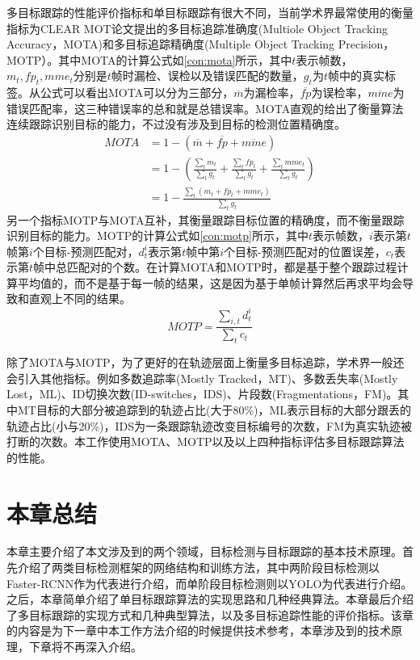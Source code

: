 多目标跟踪的性能评价指标和单目标跟踪有很大不同，当前学术界最常使用的衡量指标为CLEAR MOT\cite{bernardin2008evaluating}论文提出的多目标追踪准确度(Multiole Object Tracking Accuracy，MOTA)和多目标追踪精确度(Multiple Object Tracking Precision，MOTP）。其中MOTA的计算公式如\ref{con:mota}所示，其中$t$表示帧数，$m_t, fp_t, mme_t$分别是$t$帧时漏检、误检以及错误匹配的数量，$g_t$为$t$帧中的真实标签。从公式可以看出MOTA可以分为三部分，$\overline{m}$为漏检率，$\overline{fp}$为误检率，$\overline{mme}$为错误匹配率，这三种错误率的总和就是总错误率。MOTA直观的给出了衡量算法连续跟踪识别目标的能力，不过没有涉及到目标的检测位置精确度。
\begin{equation}
\begin{split}
MOTA & = 1 - (\overline{m} + \overline{fp} + \overline{mme})\\
& = 1 - \left(\frac{\sum_t m_t}{\sum_t g_t} + \frac{\sum_t fp_t}{\sum_t g_t} + \frac{\sum_t mme_t}{\sum_t g_t} \right)\\
& = 1 - \frac{\sum_t (m_t + fp_t + mme_t)}{\sum_t g_t}
\end{split}
\label{con:mota}
\end{equation}
另一个指标MOTP与MOTA互补，其衡量跟踪目标位置的精确度，而不衡量跟踪识别目标的能力。MOTP的计算公式如\ref{con:motp}所示，其中$t$表示帧数，$i$表示第$t$帧第$i$个目标-预测匹配对，$d^i_t$表示第$t$帧中第$i$个目标-预测匹配对的位置误差，$c_t$表示第$t$帧中总匹配对的个数。在计算MOTA和MOTP时，都是基于整个跟踪过程计算平均值的，而不是基于每一帧的结果，这是因为基于单帧计算然后再求平均会导致和直观上不同的结果。
\begin{equation}
MOTP = \frac{\sum_{i,t} d^i_t}{\sum_t c_t}
\label{con:motp}
\end{equation}

除了MOTA与MOTP，为了更好的在轨迹层面上衡量多目标追踪，学术界一般还会引入其他指标。例如多数追踪率(Mostly Tracked，MT)、多数丢失率(Mostly Lost，ML)、ID切换次数(ID-switches，IDS)、片段数(Fragmentations，FM)。其中MT目标的大部分被追踪到的轨迹占比(大于80\%)，ML表示目标的大部分跟丢的轨迹占比(小与20\%)，IDS为一条跟踪轨迹改变目标编号的次数，FM为真实轨迹被打断的次数。本工作使用MOTA、MOTP以及以上四种指标评估多目标跟踪算法的性能。

\section{本章总结}
\label{tech_conclusion}
本章主要介绍了本文涉及到的两个领域，目标检测与目标跟踪的基本技术原理。首先介绍了两类目标检测框架的网络结构和训练方法，其中两阶段目标检测以Faster-RCNN作为代表进行介绍，而单阶段目标检测则以YOLO为代表进行介绍。之后，本章简单介绍了单目标跟踪算法的实现思路和几种经典算法。本章最后介绍了多目标跟踪的实现方式和几种典型算法，以及多目标追踪性能的评价指标。该章的内容是为下一章中本工作方法介绍的时候提供技术参考，本章涉及到的技术原理，下章将不再深入介绍。

\ifprint
	\newpage
	\thispagestyle{empty}
	\mbox{}
	
	\clearpage
	\setcounter{page}{10}
\fi